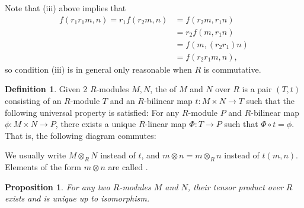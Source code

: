 \documentclass[11pt]{book}
\newcounter{counter}
\newtheorem{proposition}[counter]{Proposition}   \newtheorem{problem}[counter]{Problem}   \newtheorem*{proposition*}{Proposition}   \newtheorem*{lemma*}{Lemma}
\theoremstyle{definition}   \newtheorem{defn}[counter]{Definition} %
\DeclareMathOperator{\ra}{\rightarrow}   \DeclareMathOperator{\Poly}{\mathbf{P}}   \DeclareMathOperator{\spn}{\textnormal{span}}   \DeclareMathOperator{\aut}{\textnormal{Aut}}
\newcommand{\vs}{\vspace{8pt}}
\numberwithin{counter}{chapter}
\begin{document}
\vs

\begin{remark*}
Note that (iii) above implies that 
\begin{align*}
f(r_1r_1m,n) = r_1f(r_2m,n) &= f(r_2m,r_1n) \\
&= r_2f(m,r_1n) \\
&= f(m,(r_2r_1)n) \\
&= f(r_2r_1m,n),
\end{align*}
so condition (iii) is in general only reasonable when $R$ is commutative. 
\end{remark*}

\vs

\begin{defn}
Given 2 $R$-modules $M,N$, the  of $M$ and $N$ over $R$ is a pair $(T,t)$ consisting of an $R$-module $T$ and an $R$-bilinear map $t : M \times N \ra T$ such that the following universal property is satisfied: For any $R$-module $P$ and $R$-bilinear map $\phi : M \times N \ra P$, there exists a unique $R$-linear map $\Phi : T \ra P$ such that $\Phi \circ t = \phi$. That is, the following diagram commutes:

\end{defn}

\vs

\noindent {} We usually write $M \otimes_R N$ instead of $t$, and $m \otimes n = m \otimes_R n$ instead of $t(m,n)$. Elements of the form $m \otimes n$ are called .

\newpage

\begin{proposition}
For any two $R$-modules $M$ and $N$, their tensor product over $R$ exists and is unique up to isomorphism.
\end{proposition}
\end{document}
